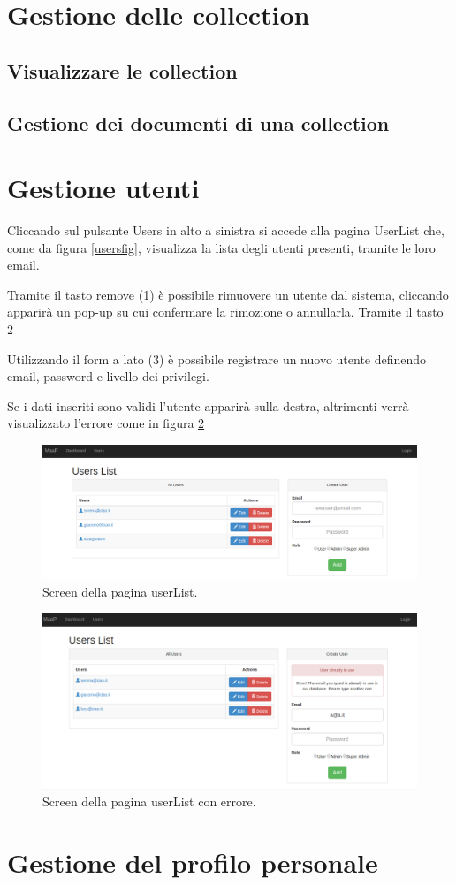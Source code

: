 \section{Gestione delle collection}
\subsection{Visualizzare le collection}
\subsection{Gestione dei documenti di una collection}

\section{Gestione utenti}
\label{nuovoutente}
Cliccando sul pulsante Users in alto a sinistra si accede alla pagina UserList che, come da figura \ref{usersfig}, visualizza la lista degli utenti presenti, tramite le loro email.

Tramite il tasto remove (1) è possibile rimuovere un utente dal sistema, cliccando apparirà un pop-up su cui confermare la rimozione o annullarla. Tramite il tasto 2 %

Utilizzando il form a lato (3) è possibile registrare un nuovo utente definendo email, password e livello dei privilegi.

Se i dati inseriti sono validi l'utente apparirà sulla destra, altrimenti verrà visualizzato l'errore come in figura \ref{userserrorfig}

\begin{figure}[h]
\label{userslist}
	\centering \includegraphics[width=1\textwidth]{userList.png}
	\caption{Screen della pagina userList.}
\end{figure}

\begin{figure}[h]
\label{userserrorfig}
	\centering \includegraphics[width=1\textwidth]{userListError.png}
	\caption{Screen della pagina userList con errore. }
\end{figure}

\section{Gestione del profilo personale}





